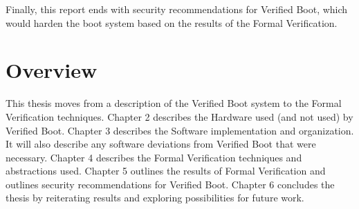 Finally, this report ends with security recommendations for Verified Boot, which
would harden the boot system based on the results of the Formal Verification.

\section{Overview}

This thesis moves from a description of the Verified Boot system to the Formal
Verification techniques.
Chapter 2 describes the Hardware used (and not used) by Verified Boot.
Chapter 3 describes the Software implementation and organization.
It will also describe any software deviations from Verified Boot that were
necessary.
Chapter 4 describes the Formal Verification techniques and abstractions used.
Chapter 5 outlines the results of Formal Verification and outlines security
recommendations for Verified Boot.
Chapter 6 concludes the thesis by reiterating results and exploring
possibilities for future work.
